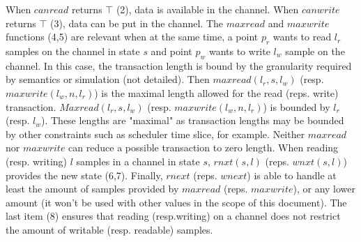 \documentclass{article}
\begin{document}
When $canread$ returns $\top$ (2), data is available in the channel. When $canwrite$ returns $\top$ (3), data can be put in the channel. The $maxread$ and $maxwrite$ functions (4,5) are relevant when at the same time, a point $p_r$ wants to read $l_r$ samples on the channel in state $s$ and point $p_w$ wants to write $l_w$ sample on the channel. In this case, the transaction length is bound by the granularity required by semantics or simulation (not detailed). Then $maxread(l_r,s,l_w)$ (resp. $maxwrite(l_w,n,l_r)$) is the maximal length allowed for the read (reps. write) transaction. $Maxread(l_r,s,l_w)$ (resp. $maxwrite(l_w,n,l_r)$) is bounded by $l_r$ (resp. $l_w$). These lengths are "maximal" as transaction lengths may be bounded by other constraints such as scheduler time slice, for example. Neither $maxread$ nor $maxwrite$ can reduce a possible transaction to zero length. When reading (resp. writing) $l$ samples in a channel in state $s$, $rnxt(s,l)$ (reps. $wnxt(s,l)$) provides the new state (6,7). Finally, $rnext$ (reps. $wnext$) is able to handle at least the amount of samples provided by $maxread$ (reps. $maxwrite$), or any lower amount (it won't be used with other values in the scope of this document). The last item (8) ensures that reading (resp.writing) on a channel does not restrict the amount of writable (resp.  readable) samples.
\end{document}
